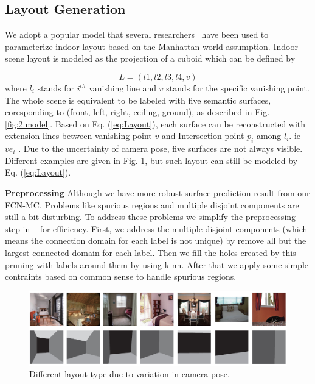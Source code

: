 



\subsection{Layout Generation}
\label{subsection:optimization}
We adopt a popular model that several  researchers~\cite{wang2013discriminative,dasgupta2016delay,ren2016coarse} have been used to parameterize indoor layout based on the Manhattan world assumption. 
Indoor scene layout is modeled as the projection of a cuboid which can be defined by 

\begin{equation}
	\label{eq:Layout}
	L = (l1, l2, l3, l4, v)
\end{equation}
where $l_{i}$ stands for $i^{th}$ vanishing line and $v$ stands for the specific vanishing point. The whole scene is equivalent to be labeled with five semantic surfaces, coresponding to (front, left, right, ceiling, ground), as described in Fig. \ref{fig:2.model}. Based on Eq. (\ref{eq:Layout}), each surface can be reconstructed with extension lines between vanishing point $v$ and Intersection point $p_i$ among $l_{i}$. ie $ve_i$ . Due to the uncertainty of camera pose, five surfaces are not always visible. Different examples are given in Fig. \ref{fig:different-layout-type}, but such layout can still be modeled by Eq. (\ref{eq:Layout}).

\textbf{Preprocessing} 
Although we have more robust surface prediction result from our FCN-MC. Problems like spurious regions and multiple disjoint components are still a bit disturbing. To address these problems we simplify the preprocessing step in ~\cite{dasgupta2016delay} for efficiency. First, we address the multiple disjoint components (which means the connection domain for each label is not unique) by remove all but the largest connected domain for each label. Then we fill the holes created by this pruning with labels around them by using k-nn. After that we apply some simple contraints based on common sense to handle spurious regions.
\begin{figure}
	\centering
	\includegraphics[width=\columnwidth]{figure/different-layout-type.png}
	\caption{Different layout type due to variation in camera pose.  }
	\label{fig:different-layout-type}
\end{figure}